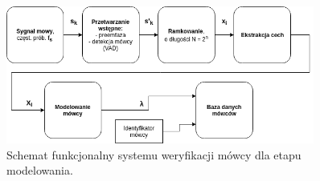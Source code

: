 \begin{figure}[ht!]
  \centering
    \includegraphics[width=0.9\textwidth]{./fundiagmodel.png}
    \caption{\label{fig:fundiagmodel} Schemat funkcjonalny systemu weryfikacji mówcy dla etapu modelowania.}
\end{figure}

